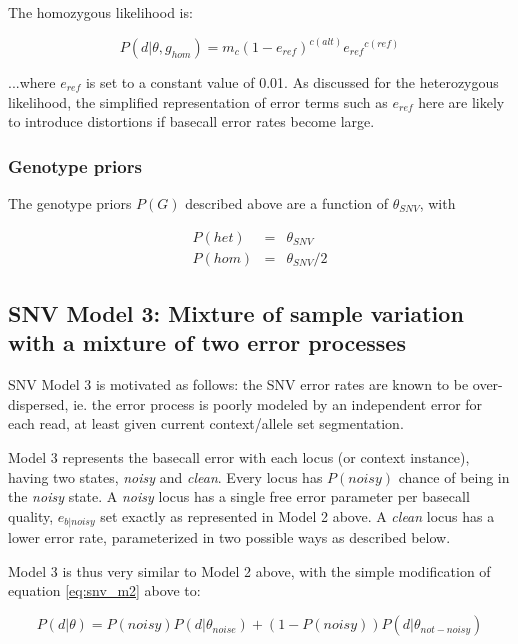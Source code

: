 \documentclass{article}
\begin{document}
The homozygous likelihood is:

\begin{equation*}
P (d \vert \theta, g_{hom}) = m_c (1-e_{ref})^{c(alt)} {e_{ref}}^{c(ref)}
\end{equation*}

...where $e_{ref}$ is set to a constant value of 0.01. As discussed for the heterozygous likelihood, the simplified representation of error terms such as $e_{ref}$ here are likely to introduce distortions if basecall error rates become large.


\subsubsection{Genotype priors}

The genotype priors $P(G)$ described above are a function of $\theta_{SNV}$, with

\begin{eqnarray*}
P(het) &=& \theta_{SNV} \\
P(hom) &=& \theta_{SNV} / 2
\end{eqnarray*}


\subsection{SNV Model 3: Mixture of sample variation with a mixture of two error processes}

SNV Model 3 is motivated as follows: the SNV error rates are known to be over-dispersed, ie. the error process is poorly modeled by an independent error for each read, at least given current context/allele set segmentation.

Model 3 represents the basecall error with each locus (or context instance), having two states, \emph{noisy} and \emph{clean}. Every locus has $P(noisy)$ chance of being in the \emph{noisy} state. A \emph{noisy} locus has a single free error parameter per basecall quality, $e_{b|noisy}$ set exactly as represented in Model 2 above. A \emph{clean} locus has a lower error rate, parameterized in two possible ways as described below.

Model 3 is thus very similar to Model 2 above, with the simple modification of equation \ref{eq:snv_m2} above to:

\begin{equation*}
P(d \vert \theta) = P(noisy) P (d \vert \theta_{noise}) + (1-P(noisy)) P (d \vert \theta_{not-noisy})
\end{equation*}
\end{document}

